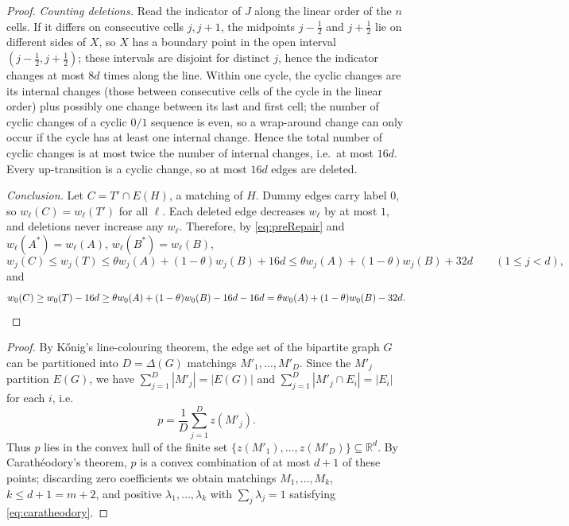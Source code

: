 \documentclass[11pt,a4paper]{article}
\theoremstyle{plain}
\theoremstyle{definition}
\theoremstyle{remark}
\newcommand{\R}{\mathbb R}
\begin{document}
\begin{proof}
\emph{Counting deletions.} Read the indicator of $J$ along the linear order of the $n$ cells. If it differs on consecutive cells $j,j+1$, the midpoints $j-\frac12$ and $j+\frac12$ lie on different sides of $X$, so $X$ has a boundary point in the open interval $(j-\frac12,j+\frac12)$; these intervals are disjoint for distinct $j$, hence the indicator changes at most $8d$ times along the line. Within one cycle, the cyclic changes are its internal changes (those between consecutive cells of the cycle in the linear order) plus possibly one change between its last and first cell; the number of cyclic changes of a cyclic $0/1$ sequence is even, so a wrap-around change can only occur if the cycle has at least one internal change. Hence the total number of cyclic changes is at most twice the number of internal changes, i.e.\ at most $16d$. Every up-transition is a cyclic change, so at most $16d$ edges are deleted.

\emph{Conclusion.} Let $C=T'\cap E(H)$, a matching of $H$. Dummy edges carry label $0$, so $w_\ell(C)=w_\ell(T')$ for all $\ell$. Each deleted edge decreases $w_\ell$ by at most $1$, and deletions never increase any $w_\ell$. Therefore, by \eqref{eq:preRepair} and $w_\ell(A^*)=w_\ell(A)$, $w_\ell(B^*)=w_\ell(B)$,
\[
 w_j(C)\le w_j(T)\le\theta w_j(A)+(1-\theta)w_j(B)+16d\le\theta w_j(A)+(1-\theta)w_j(B)+32d\qquad(1\le j<d),
\]
and
\[
 w_0(C)\ge w_0(T)-16d\ge\theta w_0(A)+(1-\theta)w_0(B)-16d-16d=\theta w_0(A)+(1-\theta)w_0(B)-32d .
\qedhere
\]
\end{proof}

\label{pf:reduction}
\lemreduction*
\begin{proof}
By Kőnig's line-colouring theorem, the edge set of the bipartite graph $G$ can be partitioned into $D=\Delta(G)$ matchings $M'_1,\dots,M'_D$. Since the $M'_j$ partition $E(G)$, we have $\sum_{j=1}^D|M'_j|=|E(G)|$ and $\sum_{j=1}^D|M'_j\cap E_i|=|E_i|$ for each $i$, i.e.
\[
 p=\frac1D\sum_{j=1}^Dz(M'_j).
\]
Thus $p$ lies in the convex hull of the finite set $\{z(M'_1),\dots,z(M'_D)\}\subseteq\R^d$. By Carathéodory's theorem, $p$ is a convex combination of at most $d+1$ of these points; discarding zero coefficients we obtain matchings $M_1,\dots,M_k$, $k\le d+1=m+2$, and positive $\lambda_1,\dots,\lambda_k$ with $\sum_j\lambda_j=1$ satisfying \eqref{eq:caratheodory}.
\end{proof}
\end{document}
